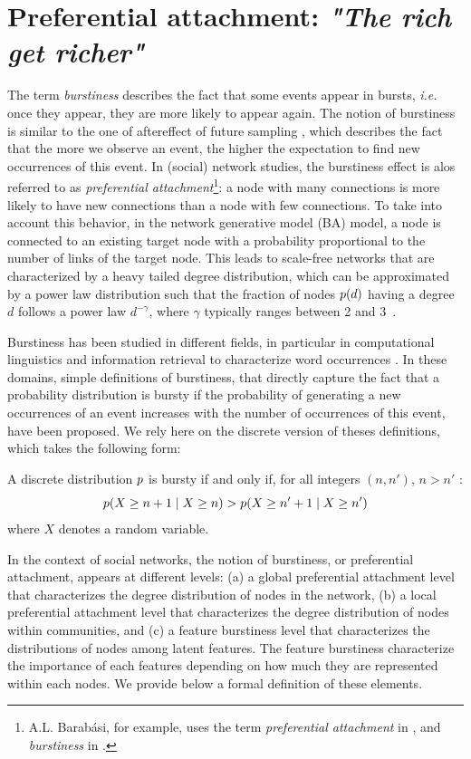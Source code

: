 \section{Preferential attachment: \emph{"The rich get richer"}}
\label{sec:burstiness}

The term \textit{burstiness} describes the fact that some events appear in bursts, \textit{i.e.} once they appear, they are more likely to appear again. The notion of burstiness is similar to the one of aftereffect of future sampling \cite{feller_68}, which describes the fact that the more we observe an event, the higher the expectation to find new occurrences of this event. In (social) network studies, the burstiness effect is alos referred to as \textit{preferential attachment}\footnote{A.L. Barab\'asi, for example, uses the term \textit{preferential attachment} in \cite{barabasi1999emergence}, and \textit{burstiness} in \cite{barabasi_burst}.}: a node with many connections is more likely to have new connections than a node with few connections. To take into account this behavior, in the network generative model  (BA) \cite{albert2002statistical} model, a node is connected to an existing target node with a probability proportional to the number of links of the target node. This leads to scale-free networks that are characterized by a heavy tailed degree distribution, which can be approximated by a power law distribution such that the fraction of nodes $p(d)$ having a degree $d$ follows a power law $d^{-\gamma}$, where $\gamma$ typically ranges between 2 and 3~\cite{barabasi1999emergence}. 

Burstiness has been studied in different fields, in particular in computational linguistics and information retrieval to characterize word occurrences \cite{church1995poisson}. In these domains, simple definitions of burstiness, that directly capture the fact that a probability distribution is bursty if the probability of generating a new occurrences of an event increases with the number of occurrences of this event, have been proposed\cite{clinchant2008bnb,clinchant2010information}. We rely here on the discrete version of theses definitions, which takes the following form:
%
\begin{definition}[Burstiness]
	A discrete distribution $p$ is bursty if and only if, for all integers $(n, n')$, $n > n'$ :
	\begin{equation}
	p(X \geq n+1 \mid X \geq n) > p(X \geq n'+1 \mid X \geq n') \nonumber
	\end{equation}
	where $X$ denotes a random variable.
\label{def:burst}
\end{definition}
%
In the context of social networks, the notion of burstiness, or preferential attachment, appears at different levels: (a) a global preferential attachment level that characterizes the degree distribution of nodes in the network, (b) a local preferential attachment level that characterizes the degree distribution of nodes within communities, and (c) a feature burstiness level that characterizes the distributions of nodes among latent features. The feature burstiness characterize the importance of each features depending on how much they are represented within each nodes. We provide below a formal definition of these elements.
%

